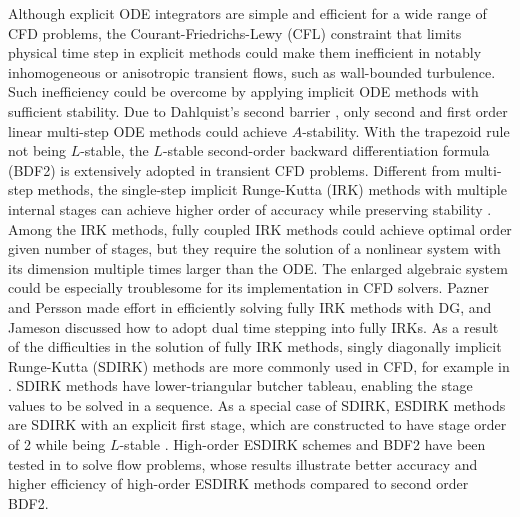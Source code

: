 \documentclass[preprint,12pt]{elsarticle}
\begin{document}
Although explicit ODE integrators
are simple and efficient for a wide range of
CFD problems,
the Courant-Friedrichs-Lewy (CFL) constraint
that limits physical time step in explicit
methods could make them inefficient in
notably inhomogeneous or anisotropic
transient flows,
such as wall-bounded turbulence.
Such inefficiency could be overcome by
applying implicit ODE methods with
sufficient stability.
Due to Dahlquist's second barrier
\cite{dahlquist1963special},
only second and first order linear multi-step ODE methods
could achieve $A$-stability. With the
trapezoid rule not being $L$-stable, the $L$-stable
second-order backward differentiation formula (BDF2)
is extensively adopted in transient CFD problems.
Different from multi-step methods,
the single-step implicit Runge-Kutta (IRK) methods
with multiple internal stages
can achieve higher order of accuracy while
preserving stability \cite{butcher2016ODEBook}.
Among the IRK methods, fully coupled IRK methods
could achieve optimal order given number of stages,
but they require the solution of a nonlinear
system with its dimension multiple times larger
than the ODE. The enlarged algebraic system
could be especially troublesome for its implementation in
CFD solvers.
Pazner and Persson
\cite{pazner2017stage}
made effort in efficiently solving
fully IRK methods with DG, and
Jameson \cite{jameson2017evaluation}
discussed how to adopt dual time stepping
into fully IRKs.
As a result of the difficulties in the solution
of fully IRK methods,
singly diagonally implicit Runge-Kutta (SDIRK)
methods are more commonly used in CFD, for example in
\cite{wang2017compact_VR}.
SDIRK methods have lower-triangular butcher tableau,
enabling the stage values to be solved in a sequence.
As a special case of SDIRK,
ESDIRK methods are SDIRK with an explicit first stage,
which are constructed to have
stage order of 2 while being $L$-stable
\cite{kennedy2003additiveARK,kvaerno2004singly}.
High-order ESDIRK schemes and
BDF2 have been tested in
\cite{
    bijl2002implicitBDFvESDIRK,
    wang2007implicitDGTests}
to solve flow problems,
whose results illustrate
better accuracy and higher efficiency
of high-order ESDIRK methods
compared to second order BDF2.
\end{document}
